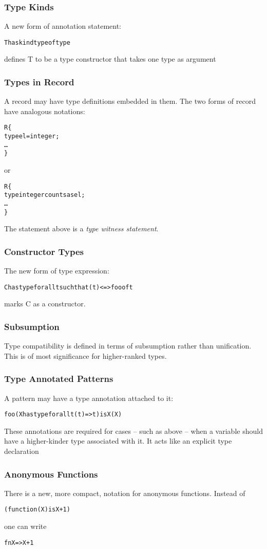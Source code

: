 \subsubsection{Type Kinds}
A new form of annotation statement:
\begin{alltt}
T has kind type of type
\end{alltt}
defines T to be a type constructor that takes one type as argument

\subsubsection{Types in Record}
A record may have type definitions embedded in them. The two forms of record have analogous notations:
\begin{alltt}
R\{
  type el = integer;
  \ldots
\}
\end{alltt}
or
\begin{alltt}
R\{
  type integer counts as el;
  \ldots
\}
\end{alltt}
The statement above is a \emph{type witness statement}.

\subsubsection{Constructor Types}
The new form of type expression:
\begin{alltt}
C has type for all t such that (t)<=>foo of t
\end{alltt}
marks C as a constructor.

\subsubsection{Subsumption}
Type compatibility is defined in terms of subsumption rather than unification.
This is of most significance for higher-ranked types.

\subsubsection{Type Annotated Patterns}
A pattern may have a type annotation attached to it:
\begin{alltt}
foo(X has type for all t (t)=>t) is X(X)
\end{alltt}
These annotations are required for cases -- such as above -- when a variable should have a higher-kinder type associated with it. It acts like an explicit type declaration

\subsubsection{Anonymous Functions}
There is a new, more compact, notation for anonymous functions. Instead of 
\begin{alltt}
(function(X) is X+1)
\end{alltt}
one can write
\begin{alltt}
fn X => X+1
\end{alltt}

